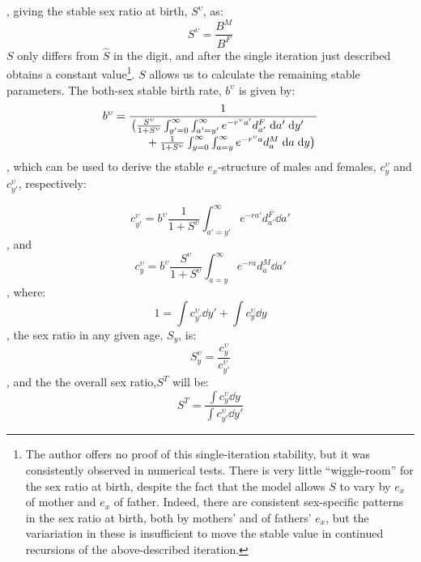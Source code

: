 , giving the stable sex ratio at birth, $S^\upsilon$, as:
\begin{equation}
S^\upsilon = \frac{B^M}{B^F}
\end{equation}
$S$ only differs from $\hat{S}$ in the  digit, and after the single
iteration just described obtains a constant value\footnote{The author offers
no proof of this single-iteration stability, but it was consistently observed
in numerical tests. There is very little ``wiggle-room'' for the sex ratio at
birth, despite the fact that the model allows $S$ to vary by $e_x$ of mother and
$e_x$ of father. Indeed, there are consistent sex-specific patterns in the sex ratio
at birth, both by mothers' and of fathers' $e_x$, but the
variariation in these is insufficient to move the stable value in continued
recursions of the above-described iteration.}. $S$ allows us to calculate the
remaining stable parameters. The both-sex stable birth rate, $b^\upsilon$ is given by:
\begin{equation}
b^\upsilon = \frac{1}{
            \splitfrac{\big(\frac{S^\upsilon}{1+S^\upsilon} \int _{y'=0}^\infty
            \int _{a'=y'}^\infty e^{-r^\upsilon a'} d_{a'}^F \dd a' \dd y'}{ + 
             \frac{1}{1+S^\upsilon} \int _{y=0}^\infty \int _{a=y}^\infty
             e^{-r^\upsilon a} d_{a}^M \dd a \dd y\big)}  }                   
\end{equation}
, which can be used to derive the stable $e_x$-structure of males and females,
$c_y^\upsilon$ and $c_{y'}^\upsilon$, respectively:

\begin{equation}
c_{y'}^\upsilon = b^\upsilon \frac{1}{1+S^\upsilon} \int _{a'=y'}^\infty
e^{-ra'} d_{a'}^F \dd a'
\end{equation}
, and
\begin{equation}
c_{y}^\upsilon = b^\upsilon \frac{S^\upsilon}{1+S^\upsilon} \int _{a=y}^\infty
e^{-ra} d_{a}^M \dd a'
\end{equation}
, where:
\begin{equation}
1 = \int c_{y'}^\upsilon \dd y' + \int c_{y}^\upsilon \dd y
\end{equation}
, the sex ratio in any given age, $S_y$, is:
\begin{equation}
S_y^\upsilon = \frac{c_{y}^\upsilon}{c_{y'}^\upsilon}
\end{equation}
, and the the overall sex ratio,$S^T$ will be:
\begin{equation}
S^T= \frac{\int c_{y}^\upsilon \dd y}{\int c_{y'}^\upsilon \dd y'}
\end{equation}

